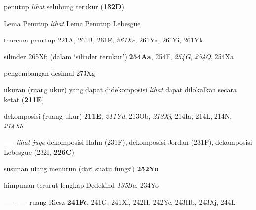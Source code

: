  penutup {\it lihat} selubung terukur ({\bf 132D})


Lema Penutup {\it lihat} Lema Penutup Lebesgue


















teorema penutup 221A, 261B, 261F, {\it 261Xc}, 261Ya, 261Yi, 261Yk




















 silinder 265Xf; (dalam `silinder terukur') {\bf 254Aa}, 254F, {\it 254G}, {\it 254Q}, 254Xa






\indexmedskip












pengembangan desimal 273Xg




ukuran (ruang ukur) yang dapat didekomposisi {\it lihat} dapat dilokalkan secara ketat ({\bf 211E})


dekomposisi (ruang ukur) {\bf 211E}, {\it 211Yd}, 213Ob,
{\it 213Xj}, 214Ia, 214L, 214N, {\it 214Xh} 


-----  {\it lihat juga }
  dekomposisi Hahn (231F), dekomposisi Jordan (231F), dekomposisi Lebesgue (232I, {\bf 226C})


susunan ulang menurun (dari suatu fungsi) {\bf 252Yo}






{himpunan terurut lengkap Dedekind } {\it 135Ba}, 234Yo 


----- ----- ruang Riesz {\bf 241Fc}, 241G, 241Xf, 242H, 242Yc,
243Hb, 243Xj, 244L






